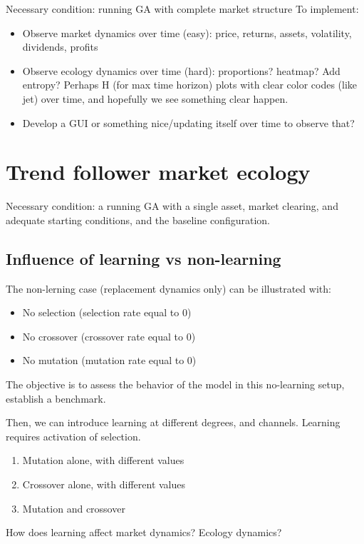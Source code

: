 \documentclass{article}
\begin{document}
Necessary condition: running GA with complete market structure
To implement:
\begin{itemize}
    \item Observe market dynamics over time (easy): price, returns, assets, volatility, dividends, profits
    \item Observe ecology dynamics over time (hard): proportions? heatmap? Add entropy?
    Perhaps H (for max time horizon) plots with clear color codes (like jet) over time, and hopefully we see something clear happen.
    \item Develop a GUI or something nice/updating itself over time to observe that?
\end{itemize}

\section{Trend follower market ecology}

Necessary condition: a running GA with a single asset, market clearing, and adequate starting conditions, and the baseline configuration.

\subsection{Influence of learning vs non-learning}
The non-lerning case (replacement dynamics only) can be illustrated with:
\begin{itemize}
    \item No selection (selection rate equal to 0)
    \item No crossover (crossover rate equal to 0)
    \item No mutation (mutation rate equal to 0)
\end{itemize}
The objective is to assess the behavior of the model in this no-learning setup, establish a benchmark.

Then, we can introduce learning at different degrees, and channels. Learning requires activation of selection.

\begin{enumerate}
    \item Mutation alone, with different values
    \item Crossover alone, with different values
    \item Mutation and crossover
\end{enumerate}

How does learning affect market dynamics? Ecology dynamics?
\end{document}

